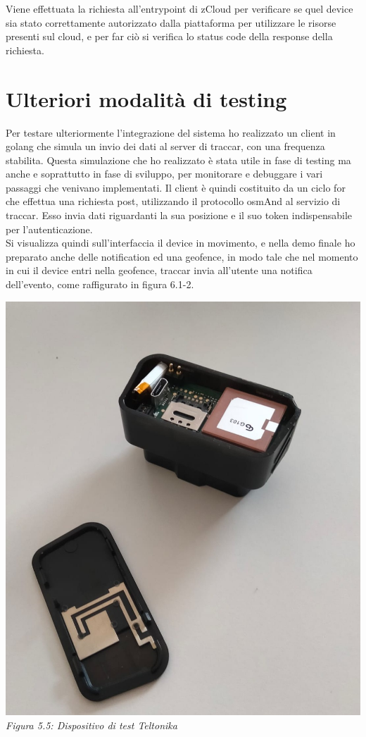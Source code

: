 \documentclass[a4paper,titlepage,12pt]{book}
\begin{document}
\noindent Viene effettuata la richiesta all'entrypoint di zCloud per verificare se quel device sia stato correttamente autorizzato dalla piattaforma per utilizzare le risorse presenti sul cloud, e per far ciò si verifica lo status code della response della richiesta.

\section{\sffamily
Ulteriori modalità di testing}
Per testare ulteriormente l'integrazione del sistema ho realizzato un client in golang che simula un invio dei dati al server di traccar, con una frequenza stabilita. Questa simulazione che ho realizzato è stata utile in fase di testing ma anche e soprattutto in fase di sviluppo, per monitorare e debuggare i vari passaggi che venivano implementati. Il client è quindi costituito da un ciclo for che effettua una richiesta post, utilizzando il protocollo osmAnd al servizio di traccar. Esso invia dati riguardanti la sua posizione e il suo token indispensabile per l'autenticazione.\\
Si visualizza quindi sull'interfaccia il device in movimento, e nella demo finale ho preparato anche delle notification ed una geofence, in modo tale che nel momento in cui il device entri nella geofence, traccar invia all'utente una notifica dell'evento, come raffigurato in figura 6.1-2.\\
\begin{center}
\includegraphics[scale=0.2]{images/teltotest.jpeg}\\ 
\textit{Figura 5.5: Dispositivo di test Teltonika}
\end{center}
\end{document}

